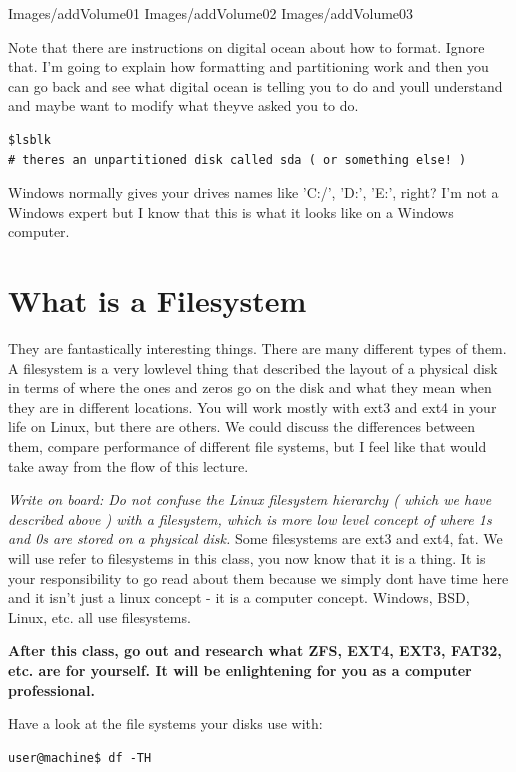 \documentclass[10pt]{article}
\begin{document}
Images/addVolume01
Images/addVolume02
Images/addVolume03

Note that there are instructions on digital ocean about how to format. Ignore
that. I'm going to explain how formatting and partitioning work and then you can
go back and see what digital ocean is telling you to do and youll understand and
maybe want to modify what theyve asked you to do.

\begin{lstlisting}
$lsblk
# theres an unpartitioned disk called sda ( or something else! )
\end{lstlisting}

Windows normally gives your drives names like 'C:/', 'D:', 'E:', right? I'm not
a Windows expert but I know that this is what it looks like on a Windows
computer.


\section{What is a Filesystem} 
They are fantastically interesting things. There
are many different types of them. A filesystem is a very lowlevel thing that
described the layout of a physical disk in terms of where the ones and zeros go
on the disk and what they mean when they are in different locations. You will
work mostly with ext3 and ext4 in your life on Linux, but there are others. We
could discuss the differences between them, compare performance of different
file systems, but I feel like that would take away from the flow of this
lecture. 

{\LARGE\textit{Write on board: Do not confuse the Linux filesystem hierarchy (
which we have described above ) with a filesystem, which is more low level
concept of where 1s and 0s are stored on a physical disk.} Some filesystems are
ext3 and ext4, fat. We will use refer to filesystems in this class, you now know
that it is a thing. It is your responsibility to go read about them because we
simply dont have time here and it isn't just a linux concept - it is a computer
concept. Windows, BSD, Linux, etc. all use filesystems.}

\begin{center}
\textbf{After this class, go out and research what ZFS, EXT4,
EXT3, FAT32, etc. are for yourself. It will be enlightening for you as a
computer professional.}
\end{center}

Have a look at the file systems your disks use with:

\begin{lstlisting}
user@machine$ df -TH
\end{lstlisting}
\end{document}
